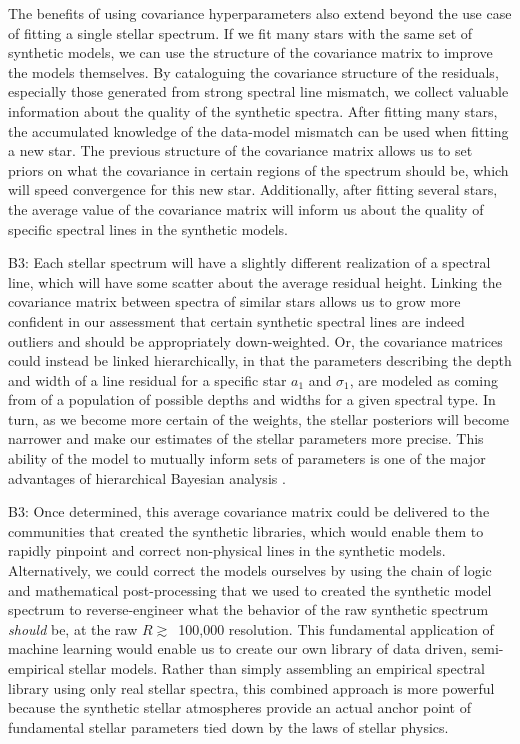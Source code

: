 \documentclass[iop,floatfix]{emulateapj}
\begin{document}
The benefits of using covariance hyperparameters also extend beyond the use case of fitting a single stellar spectrum. If we fit many stars with the same set of synthetic models, we can use the structure of the covariance matrix to improve the models themselves. By cataloguing the covariance structure of the residuals, especially those generated from strong spectral line mismatch, we collect valuable information about the quality of the synthetic spectra. After fitting many stars, the accumulated knowledge of the data-model mismatch can be used when fitting a new star. The previous structure of the covariance matrix allows us to set priors on what the covariance in certain regions of the spectrum should be, which will speed convergence for this new star. Additionally, after fitting several stars, the average value of the covariance matrix will inform us about the quality of specific spectral lines in the synthetic models.

B3: Each stellar spectrum will have a slightly different realization of a spectral line, which will have some scatter about the average residual height. Linking the covariance matrix between spectra of similar stars allows us to grow more confident in our assessment that certain synthetic spectral lines are indeed outliers and should be appropriately down-weighted. Or, the covariance matrices could instead be linked hierarchically, in that the parameters describing the depth and width of a line residual for a specific star $a_1$ and $\sigma_1$, are modeled as coming from of a population of possible depths and widths for a given spectral type. In turn, as we become more certain of the weights, the stellar posteriors will become narrower and make our estimates of the stellar parameters more precise. This ability of the model to mutually inform sets of parameters is one of the major advantages of hierarchical Bayesian analysis \citep{kruschke10}.

B3: Once determined, this average covariance matrix could be delivered to the communities that created the synthetic libraries, which would enable them to rapidly pinpoint and correct non-physical lines in the synthetic models. Alternatively, we could correct the models ourselves by using the chain of logic and mathematical post-processing that we used to created the synthetic model spectrum to reverse-engineer what the behavior of the raw synthetic spectrum \emph{should} be, at the raw $R \gtrsim$~100,000 resolution. This fundamental application of machine learning would enable us to create our own library of data driven, semi-empirical stellar models. Rather than simply assembling an empirical spectral library using only real stellar spectra, this combined approach is more powerful because the synthetic stellar atmospheres provide an actual anchor point of fundamental stellar parameters tied down by the laws of stellar physics.
\end{document}
